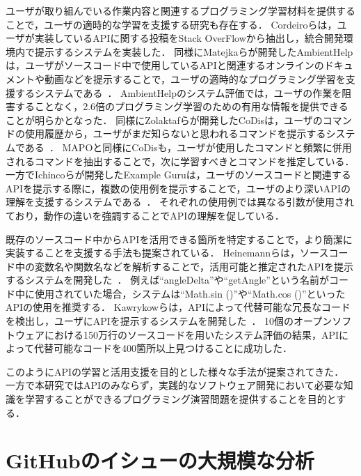 ユーザが取り組んでいる作業内容と関連するプログラミング学習材料を提供することで，ユーザの適時的な学習を支援する研究も存在する．
Cordeiroらは，ユーザが実装しているAPIに関する投稿をStack OverFlowから抽出し，統合開発環境内で提示するシステムを実装した\cite{Cordeiro_2012_extract_QA_SO}．
同様にMatejkaらが開発したAmbientHelpは，ユーザがソースコード中で使用しているAPIと関連するオンラインのドキュメントや動画などを提示することで，ユーザの適時的なプログラミング学習を支援するシステムである~\cite{Matejka_Ambient_Help}．
AmbientHelpのシステム評価では，ユーザの作業を阻害することなく，2.6倍のプログラミング学習のための有用な情報を提供できることが明らかとなった．
同様にZolaktafらが開発したCoDisは，ユーザのコマンドの使用履歴から，ユーザがまだ知らないと思われるコマンドを提示するシステムである~\cite{Zolaktaf_Recommending_Commands}．
MAPOと同様にCoDisも，ユーザが使用したコマンドと頻繁に併用されるコマンドを抽出することで，次に学習すべきとコマンドを推定している．
一方でIchincoらが開発したExample Guruは，ユーザのソースコードと関連するAPIを提示する際に，複数の使用例を提示することで，ユーザのより深いAPIの理解を支援するシステムである~\cite{Ichinco_Suggesting_API_Usage}．
それぞれの使用例では異なる引数が使用されており，動作の違いを強調することでAPIの理解を促している．

既存のソースコード中からAPIを活用できる箇所を特定することで，より簡潔に実装することを支援する手法も提案されている．
Heinemannらは，ソースコード中の変数名や関数名などを解析することで，活用可能と推定されたAPIを提示するシステムを開発した~\cite{Heinemann_Identifier_Based_API_Recommendation}．
例えば``angleDelta''や``getAngle''という名前がコード中に使用されていた場合，システムは``Math.sin ()''や``Math.cos ()''といったAPIの使用を推奨する．
Kawrykowらは，APIによって代替可能な冗長なコードを検出し，ユーザにAPIを提示するシステムを開発した~\cite{Kawrykow_Improving_API_Usage}．
10個のオープンソフトウェアにおける150万行のソースコードを用いたシステム評価の結果，APIによって代替可能なコードを400箇所以上見つけることに成功した．

このようにAPIの学習と活用支援を目的とした様々な手法が提案されてきた．
一方で本研究ではAPIのみならず，実践的なソフトウェア開発において必要な知識を学習することができるプログラミング演習問題を提供することを目的とする．


\section{GitHubのイシューの大規模な分析}

